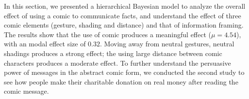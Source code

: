 
In this section, we presented a hierarchical Bayesian model to analyze the overall effect of using a comic to communicate facts, and understand the effect of three comic elements (gesture, shading and distance) and that of information framing. The results show that the use of comic produces a meaningful effect ($\mu=4.54$), with an modal effect size of $0.32$. Moving away from neutral gestures, neutral shadings produces a strong effect; the using large distance between comic characters produces a moderate effect. To further understand the persuasive power of messages in the abstract comic form, we conducted the second study to see how people make their charitable donation on real money after reading the comic message.
